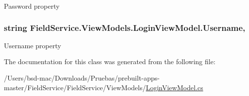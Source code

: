 Password property 

\hypertarget{class_field_service_1_1_view_models_1_1_login_view_model_aba35afcb0fde385ffebc5bb8267e4218}{
\subsubsection[{Username}]{\setlength{\rightskip}{0pt plus 5cm}string Field\+Service.\+View\+Models.\+Login\+View\+Model.\+Username\hspace{0.3cm}{\ttfamily [get]}, {\ttfamily [set]}}}\label{class_field_service_1_1_view_models_1_1_login_view_model_aba35afcb0fde385ffebc5bb8267e4218}


Username property 



The documentation for this class was generated from the following file\+:\begin{DoxyCompactItemize}
\item 
/\+Users/bsd-\/mac/\+Downloads/\+Pruebas/prebuilt-\/apps-\/master/\+Field\+Service/\+Field\+Service/\+View\+Models/\hyperlink{_view_models_2_login_view_model_8cs}{Login\+View\+Model.\+cs}\end{DoxyCompactItemize}

